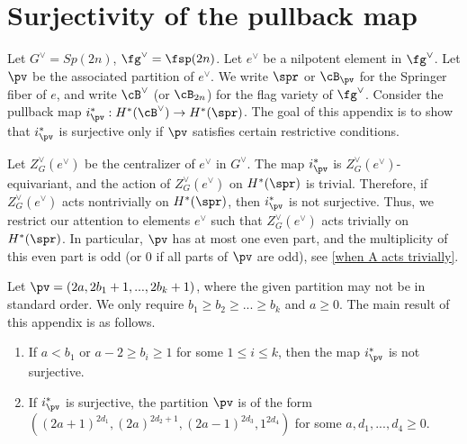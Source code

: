 \documentclass[12pt]{amsart}
\begin{document}
   
    





\section{Surjectivity of the pullback map} \label{cohomological surjectivity}
Let $G^\vee =Sp({2n})$, $\fg^\vee = \fsp({2n})$. Let $e^\vee$ be a nilpotent element in $\fg^\vee$. Let $\pv$ be the associated partition of $e^\vee$. We write $\spr$ or $\cB_{\pv}$ for the Springer fiber of $e$, and write $\cB^\vee$ (or $\cB_{2n}$) for the flag variety of $\fg^\vee$.  Consider the pullback map $i_{\pv}^*:H^*(\cB^\vee)\rightarrow H^*(\spr)$. The goal of this appendix is to show that $i_{\pv}^*$ is surjective only if $\pv$ satisfies certain restrictive conditions. 

Let $Z^{\vee}_G(e^\vee)$ be the centralizer of $e^\vee$ in $G^\vee$. The map $i_{\pv}^*$ is $Z^{\vee}_G(e^\vee)$-equivariant, and the action of $Z^{\vee}_G(e^\vee)$ on $H^*(\spr)$ is trivial. Therefore, if $Z^{\vee}_G(e^\vee)$ acts nontrivially on $H^*(\spr)$, then $i_\pv^{*}$ is not surjective. Thus, we restrict our attention to elements $e^\vee$ such that $Z^{\vee}_G(e^\vee)$ acts trivially on $H^*(\spr)$. In particular, $\pv$ has at most one even part, and the multiplicity of this even part is odd (or $0$ if all parts of $\pv$ are odd), see \cref{when A acts trivially}. 

Let $\pv= (2a, 2b_1+1,...,2b_k+1)$, where the given partition may not be in standard order. We only require $b_1\geqslant b_2\geqslant... \geqslant b_k$ and $a\geqslant 0$. The main result of this appendix is as follows.
\begin{theorem}\label{surjectivity} \leavevmode
    \begin{enumerate}
        \item If $a<b_1$ or $a-2\geqslant b_i\geqslant 1$ for some $1\leqslant i\leqslant k$, then the map $i_{\pv}^*$ is not surjective.        
        \item If $i_\pv^{*}$ is surjective, the partition $\pv$ is of the form $((2a+1)^{2d_1},(2a)^{2d_2+1},(2a-1)^{2d_3}, 1^{2d_4})$ for some $a, d_1,...,d_4\geqslant 0$. 
    \end{enumerate}
\end{theorem}
\end{document}
